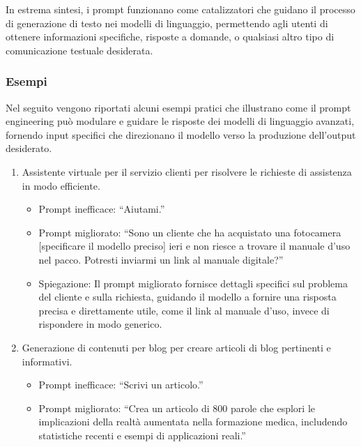         In estrema sintesi, i prompt funzionano come catalizzatori che guidano il processo di generazione di testo nei modelli di linguaggio, permettendo agli utenti di ottenere informazioni specifiche, risposte a domande, o qualsiasi altro tipo di comunicazione testuale desiderata.
        
        \subsubsection{Esempi}
            Nel seguito vengono riportati alcuni esempi pratici che illustrano come il prompt engineering può modulare e guidare le risposte dei modelli di linguaggio avanzati, fornendo input specifici che direzionano il modello verso la produzione dell'output desiderato.
            \begin{enumerate}
                \item Assistente virtuale per il servizio clienti per risolvere le richieste di assistenza in modo efficiente.
                \begin{itemize}
                    \item Prompt inefficace: ``Aiutami.''
                    
                    \item Prompt migliorato: ``Sono un cliente che ha acquistato una fotocamera [specificare il modello preciso] ieri e non riesce a trovare il manuale d'uso nel pacco. Potresti inviarmi un link al manuale digitale?''
                    
                    \item Spiegazione: Il prompt migliorato fornisce dettagli specifici sul problema del cliente e sulla richiesta, guidando il modello a fornire una risposta precisa e direttamente utile, come il link al manuale d'uso, invece di rispondere in modo generico.
                \end{itemize}

                \item Generazione di contenuti per blog per creare articoli di blog pertinenti e informativi.
                \begin{itemize}
                    \item Prompt inefficace: ``Scrivi un articolo.''
                    
                    \item Prompt migliorato: ``Crea un articolo di 800 parole che esplori le implicazioni della realtà aumentata nella formazione medica, includendo statistiche recenti e esempi di applicazioni reali.''
                    

\end{itemize}
\end{enumerate}
